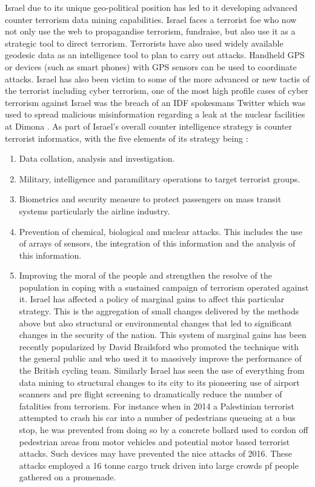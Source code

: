 Israel due to its unique geo-political position has led to it developing advanced counter terrorism data mining capabilities. Israel faces a terrorist foe who now not only use the web to propagandise terrorism, fundraise, but also use it as a strategic tool to direct terrorism. Terrorists have also used widely available geodesic data as an intelligence tool to plan to carry out attacks. Handheld GPS or devices (such as smart phones) with GPS sensors can be used to coordinate attacks. Israel has also been victim to some of the more advanced or new tactis of the terrorist including cyber terrorism, one of the most high profile cases of cyber terrorism against Israel was the breach of an IDF  spokesmans Twitter which was used to spread  malicious misinformation regarding a leak at the nuclear facilities at Dimona \citep{Israeltwitterhack}.
As part of Israel's overall counter intelligence strategy is counter terrorist informatics, with the five elements of its strategy being \citep{tucker2003strategies}:
\begin{enumerate}
	\item Data collation, analysis and investigation.
	\item Military, intelligence and paramilitary operations to target terrorist groups.
	\item Biometrics and security measure to protect passengers on mass transit systems particularly the airline industry.
	\item Prevention of chemical, biological and nuclear attacks. This includes the use of arrays of sensors, the integration of this information and the analysis of this information.
	\item Improving the moral of the people and strengthen the resolve of the population in coping with a sustained campaign of terrorism operated against it. Israel has affected a policy of marginal gains to affect this particular strategy. This is the aggregation of small changes delivered by the methods above but also structural or environmental changes that led to significant changes in the security of the nation. This system of marginal gains has been recently popularized by David Brailsford who promoted the technique with the general public \citep{durrand2014pre} and who used it to massively improve the performance of the British cycling team. Similarly Israel has seen the use of everything from data mining to structural changes to its city to its pioneering use of airport scanners and pre flight screening to dramatically reduce the number of fatalities from terrorism. For instance when in 2014 a Palestinian terrorist attempted to crash his car into a number of pedestrians queueing at a bus stop, he was prevented from doing so by a concrete bollard \citep{Israelcounterterrorismlesson}  used to cordon off pedestrian areas from motor vehicles and potential motor based terrorist attacks. Such devices may have prevented the nice attacks of 2016. These attacks employed a 16 tonne cargo truck driven into large crowds pf people gathered on a promenade\citep{nesser2016jihadi}. 
\end{enumerate}

